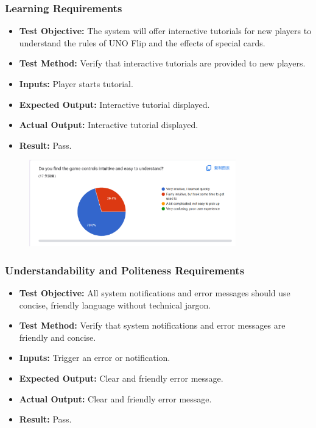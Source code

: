 \documentclass[12pt, titlepage]{article}
\begin{document}
\subsubsection{Learning Requirements}
\begin{itemize}
    \item \textbf{Test Objective:} The system will offer interactive tutorials for new players to understand the rules of UNO Flip and the effects of special cards.
    \item \textbf{Test Method:} Verify that interactive tutorials are provided to new players.
    \item \textbf{Inputs:} Player starts tutorial.
    \item \textbf{Expected Output:} Interactive tutorial displayed.
    \item \textbf{Actual Output:} Interactive tutorial displayed.
    \item \textbf{Result:} Pass.
\end{itemize}

\begin{figure}[h!]
    \centering
    \includegraphics[width=0.8\textwidth]{image2.png}
    \caption{}
    \label{fig:labelname}
\end{figure}


\subsubsection{Understandability and Politeness Requirements}
\begin{itemize}
    \item \textbf{Test Objective:} All system notifications and error messages should use concise, friendly language without technical jargon.
    \item \textbf{Test Method:} Verify that system notifications and error messages are friendly and concise.
    \item \textbf{Inputs:} Trigger an error or notification.
    \item \textbf{Expected Output:} Clear and friendly error message.
    \item \textbf{Actual Output:} Clear and friendly error message.
    \item \textbf{Result:} Pass.
\end{itemize}
\end{document}
